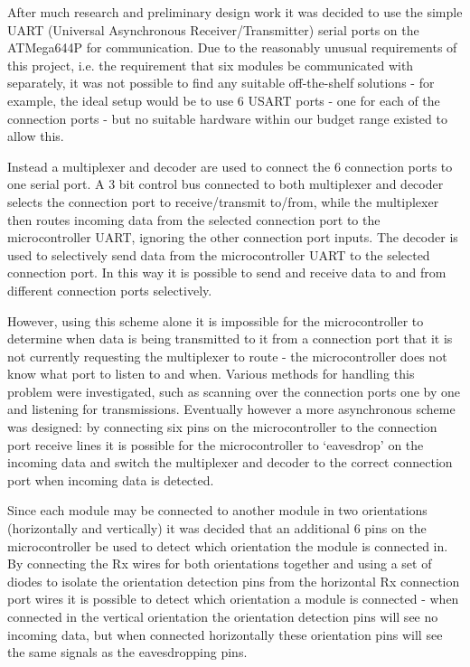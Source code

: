 After much research and preliminary design work it was decided to use the simple UART (Universal Asynchronous Receiver/Transmitter)  serial ports on the ATMega644P for communication. Due to the reasonably unusual requirements of this project, i.e. the requirement that six modules be communicated with separately, it was not possible to find any suitable off-the-shelf solutions - for example, the ideal setup would be to use 6 USART ports - one for each of the connection ports - but no suitable hardware within our budget range existed to allow this.

Instead a multiplexer and decoder are used to connect the 6 connection ports to one serial port. A 3 bit control bus connected to both multiplexer and decoder selects the connection port to receive/transmit to/from, while the multiplexer then routes incoming data from the selected connection port to the microcontroller UART, ignoring the other connection port inputs. The decoder is used to selectively send data from the microcontroller UART to the selected connection port. In this way it is possible to send and receive data to and from different connection ports selectively. 

However, using this scheme alone it is impossible for the microcontroller to determine when data is being transmitted to it from a connection port that it is not currently requesting the multiplexer to route - the microcontroller does not know what port to listen to and when. Various methods for handling this problem were investigated, such as scanning over the connection ports one by one and listening for transmissions. Eventually however a more asynchronous scheme was designed: by connecting six pins on the microcontroller to the connection port receive lines it is possible for the microcontroller to `eavesdrop' on the incoming data and switch the multiplexer and decoder to the correct connection port when incoming data is detected.

Since each module may be connected to another module in two orientations (horizontally and vertically) it was decided that an additional 6 pins on the microcontroller be used to detect which orientation the module is connected in. By connecting the Rx wires for both orientations together and using a set of diodes to isolate the orientation detection pins from the horizontal Rx connection port wires it is possible to detect which orientation a module is connected - when connected in the vertical orientation the orientation detection pins will see no incoming data, but when connected horizontally these orientation pins will see the same signals as the eavesdropping pins.

